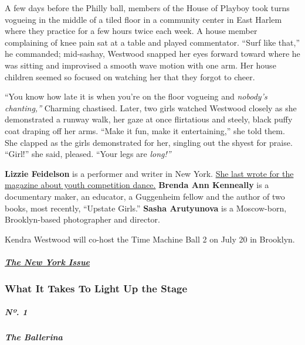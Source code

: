 A few days before the Philly ball, members of the House of Playboy took
turns vogueing in the middle of a tiled floor in a community center in
East Harlem where they practice for a few hours twice each week. A house
member complaining of knee pain sat at a table and played commentator.
``Surf like that,'' he commanded; mid-sashay, Westwood snapped her eyes
forward toward where he was sitting and improvised a smooth wave motion
with one arm. Her house children seemed so focused on watching her that
they forgot to cheer.

``You know how late it is when you're on the floor vogueing and
\emph{nobody's chanting,''} Charming chastised. Later, two girls watched
Westwood closely as she demonstrated a runway walk, her gaze at once
flirtatious and steely, black puffy coat draping off her arms. ``Make it
fun, make it entertaining,'' she told them. She clapped as the girls
demonstrated for her, singling out the shyest for praise. ``Girl!'' she
said, pleased. ``Your legs are \emph{long!''}

\textbf{Lizzie Feidelson} is a performer and writer in New York.
\href{https://www.nytimes3xbfgragh.onion/2017/12/21/magazine/inside-the-high-drama-world-of-youth-competition-dance.html}{She
last wrote for the magazine about youth competition dance.}
\textbf{Brenda Ann Kenneally} is a documentary maker, an educator, a
Guggenheim fellow and the author of two books, most recently, ``Upstate
Girls.'' \textbf{Sasha Arutyunova} is a Moscow-born, Brooklyn-based
photographer and director.

Kendra Westwood will co-host the Time Machine Ball 2 on July 20 in
Brooklyn.

\hypertarget{the-new-york-issue-1}{%
\subparagraph{\texorpdfstring{\href{https://www.nytimes3xbfgragh.onion/interactive/2019/05/30/magazine/performers-new-york.html}{The
New York Issue}}{The New York Issue}}\label{the-new-york-issue-1}}

\hypertarget{what-it-takes-to-light-up-the-stage-1}{%
\subsubsection{What It Takes To Light Up the
Stage}\label{what-it-takes-to-light-up-the-stage-1}}

\href{https://www.nytimes3xbfgragh.onion/interactive/2019/05/30/magazine/dance-ballet-new-york.html}{}

\hypertarget{nuxba-1}{%
\subparagraph{Nº. 1}\label{nuxba-1}}

\hypertarget{the-ballerina}{%
\subparagraph{The Ballerina}\label{the-ballerina}}

